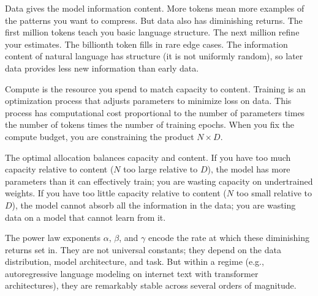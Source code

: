 Data gives the model information content. More tokens mean more examples of the patterns you want to compress. But data also has diminishing returns. The first million tokens teach you basic language structure. The next million refine your estimates. The billionth token fills in rare edge cases. The information content of natural language has structure (it is not uniformly random), so later data provides less new information than early data.

Compute is the resource you spend to match capacity to content. Training is an optimization process that adjusts parameters to minimize loss on data. This process has computational cost proportional to the number of parameters times the number of tokens times the number of training epochs. When you fix the compute budget, you are constraining the product $N \times D$.

The optimal allocation balances capacity and content. If you have too much capacity relative to content ($N$ too large relative to $D$), the model has more parameters than it can effectively train; you are wasting capacity on undertrained weights. If you have too little capacity relative to content ($N$ too small relative to $D$), the model cannot absorb all the information in the data; you are wasting data on a model that cannot learn from it.

The power law exponents $\alpha$, $\beta$, and $\gamma$ encode the rate at which these diminishing returns set in. They are not universal constants; they depend on the data distribution, model architecture, and task. But within a regime (e.g., autoregressive language modeling on internet text with transformer architectures), they are remarkably stable across several orders of magnitude.

\vspace{1em}

